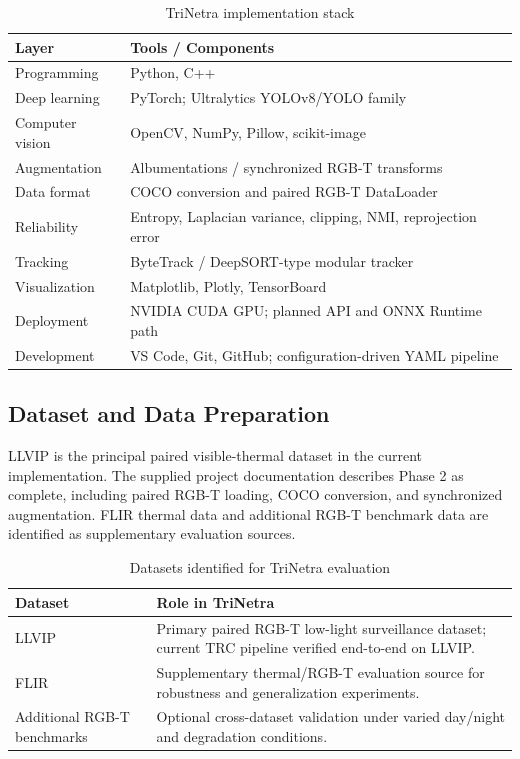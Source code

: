 \documentclass[conference]{IEEEtran}
\begin{document}
\begin{table}[!t]
\centering
\caption{TriNetra implementation stack}
\label{tab:stack}
\footnotesize
\begin{tabular}{p{}p{}}
\toprule
\textbf{Layer} & \textbf{Tools / Components}\\
\midrule
Programming & Python, C++\\
Deep learning & PyTorch; Ultralytics YOLOv8/YOLO family\\
Computer vision & OpenCV, NumPy, Pillow, scikit-image\\
Augmentation & Albumentations / synchronized RGB-T transforms\\
Data format & COCO conversion and paired RGB-T DataLoader\\
Reliability & Entropy, Laplacian variance, clipping, NMI, reprojection error\\
Tracking & ByteTrack / DeepSORT-type modular tracker\\
Visualization & Matplotlib, Plotly, TensorBoard\\
Deployment & NVIDIA CUDA GPU; planned API and ONNX Runtime path\\
Development & VS Code, Git, GitHub; configuration-driven YAML pipeline\\
\bottomrule
\end{tabular}
\end{table}

\subsection{Dataset and Data Preparation}

LLVIP is the principal paired visible-thermal dataset in the current implementation. The supplied project documentation describes Phase 2 as complete, including paired RGB-T loading, COCO conversion, and synchronized augmentation. FLIR thermal data and additional RGB-T benchmark data are identified as supplementary evaluation sources.

\begin{table}[!t]
\centering
\caption{Datasets identified for TriNetra evaluation}
\label{tab:datasets}
\footnotesize
\begin{tabular}{p{}p{}}
\toprule
\textbf{Dataset} & \textbf{Role in TriNetra}\\
\midrule
LLVIP & Primary paired RGB-T low-light surveillance dataset; current TRC pipeline verified end-to-end on LLVIP.\\
FLIR & Supplementary thermal/RGB-T evaluation source for robustness and generalization experiments.\\
Additional RGB-T benchmarks & Optional cross-dataset validation under varied day/night and degradation conditions.\\
\bottomrule
\end{tabular}
\end{table}
\end{document}
